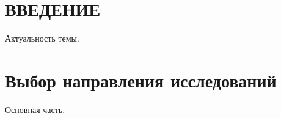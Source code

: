 
\section*{ВВЕДЕНИЕ}
Актуальность темы.

\section{Выбор направления исследований}
Основная часть.


